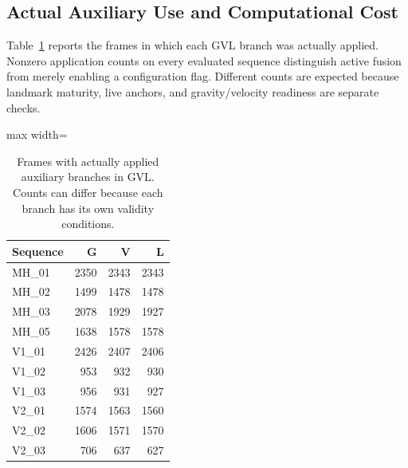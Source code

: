 \documentclass[a4paper,runningheads,twocolumn]{llncs}
\begin{document}
\subsection{Actual Auxiliary Use and Computational Cost}
Table~\ref{tab:updates} reports the frames in which each GVL branch was actually applied. Nonzero application counts on every evaluated sequence distinguish active fusion from merely enabling a configuration flag. Different counts are expected because landmark maturity, live anchors, and gravity/velocity readiness are separate checks.
\begin{table}[tb]
\caption{Frames with actually applied auxiliary branches in GVL. Counts can differ because each branch has its own validity conditions.}\label{tab:updates}
\centering\small
\begin{adjustbox}{max width=\columnwidth}
\begin{tabular}{lrrr}
\toprule
Sequence & G & V & L \\
\midrule
MH\_01 & 2350 & 2343 & 2343 \\
MH\_02 & 1499 & 1478 & 1478 \\
MH\_03 & 2078 & 1929 & 1927 \\
MH\_05 & 1638 & 1578 & 1578 \\
V1\_01 & 2426 & 2407 & 2406 \\
V1\_02 & 953 & 932 & 930 \\
V1\_03 & 956 & 931 & 927 \\
V2\_01 & 1574 & 1563 & 1560 \\
V2\_02 & 1606 & 1571 & 1570 \\
V2\_03 & 706 & 637 & 627 \\
\bottomrule
\end{tabular}
\end{adjustbox}
\end{table}
\end{document}
